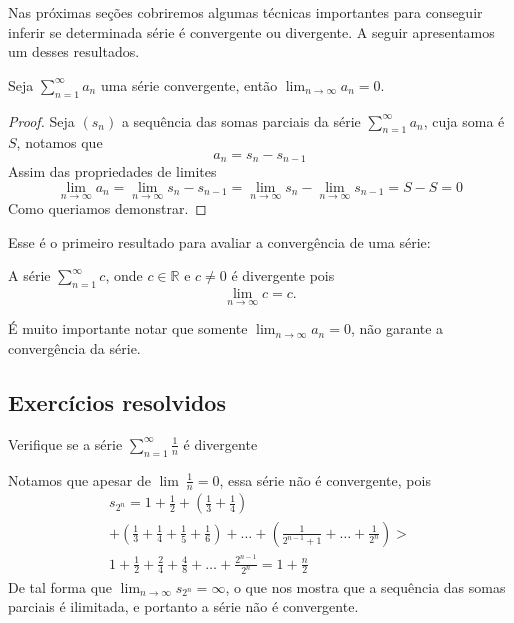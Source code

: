Nas próximas seções cobriremos algumas técnicas importantes para conseguir inferir
se determinada série é convergente ou divergente. A seguir apresentamos um desses
resultados.

\begin{teo}
    Seja $\sum_{n = 1}^{\infty} a_n$ uma série convergente, então $\lim_{n \to \infty} a_n = 0$.
\end{teo}

\begin{proof}
    Seja $(s_n)$ a sequência das somas parciais da série $\sum_{n = 1}^{\infty} a_n$, cuja soma é $S$, notamos que
    $$a_n = s_n - s_{n-1}$$
    Assim das propriedades de limites
    $$\lim_{n \to \infty} a_n = \lim_{n \to \infty} s_n - s_{n-1} = \lim_{n \to \infty} s_n - \lim_{n \to \infty} s_{n-1} = S - S = 0$$
    Como queriamos demonstrar.
\end{proof}

Esse é o primeiro resultado para avaliar a convergência de uma série:
\begin{ex}
    A série $\sum_{n = 1}^{\infty} c$, onde $c \in \mathbb{R}$ e $c \neq 0$ é 
    divergente pois
    $$\lim_{n \to \infty} c = c.$$
\end{ex}

É muito importante notar que somente $\lim_{n \to \infty} a_n = 0$, não garante a convergência
da série.
\subsection*{Exercícios resolvidos}

\construirExeresol
\begin{exeresol}
    Verifique se a série $\sum_{n = 1}^{\infty} \frac{1}{n}$ é divergente 
\end{exeresol}

\begin{resol}
    Notamos que apesar de $\lim{\:} \frac{1}{n} = 0$, essa série não é convergente,
    pois
\begin{eqnarray}
    s_{2^n} = 1 + \frac{1}{2} + (\frac{1}{3}+\frac{1}{4}) \\
    + (\frac{1}{3}+\frac{1}{4}+\frac{1}{5}+\frac{1}{6})+\dots+(\frac{1}{2^{n-1}+1}+\dots +\frac{1}{2^n}) > \\
    1 + \frac{1}{2}+\frac{2}{4}+ \frac{4}{8}+ \dots +\frac{2^{n-1}}{2^n} = 1 + \frac{n}{2}
\end{eqnarray}   
    De tal forma que $\lim_{n \to \infty} s_{2^n} = \infty$, o que nos mostra que
    a sequência das somas parciais é ilimitada, e portanto a série não é
    convergente.
 \end{resol}


